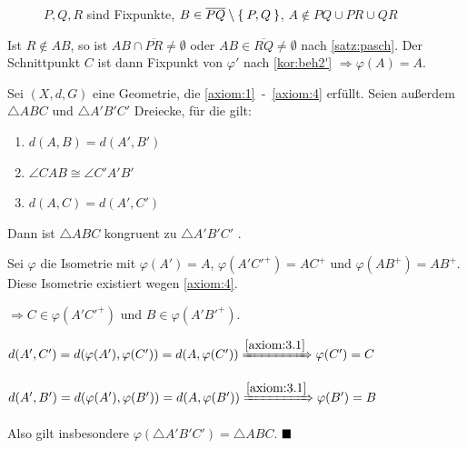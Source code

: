 \begin{beweis}
\begin{enumerate}[label=(Teil \roman*),ref=(Teil \roman*)]
        \begin{figure}[htp]
            \centering
            
            \caption{$P, Q, R$ sind Fixpunkte, $B \in \overline{PQ} \setminus \Set{P,Q}$, $A \notin PQ \cup PR \cup QR$}
            \label{fig:geometry-1}
        \end{figure}

        Ist $R \notin AB$, so ist $AB \cap \overline{PR} \neq \emptyset$
        oder $AB \in \overline{RQ} \neq \emptyset$ nach \cref{satz:pasch}.
        Der Schnittpunkt $C$ ist dann Fixpunkt von $\varphi'$
        nach \cref{kor:beh2'} $\Rightarrow \varphi(A) = A$.
    \end{enumerate}
\end{beweis}

\begin{bemerkung}%
    Sei $(X, d, G)$ eine Geometrie, die \ref{axiom:1}~-~\ref{axiom:4} erfüllt.
    Seien außerdem $\triangle ABC$ und $\triangle A'B'C'$ Dreiecke, für die gilt:
    \begin{enumerate}[label=(\roman*)]
        \item \label{bem:sws.i} $d(A, B) = d(A', B')$
        \item \label{bem:sws.ii} $\angle CAB \cong \angle C'A'B'$
        \item \label{bem:sws.iii} $d(A, C) = d(A', C')$
    \end{enumerate}

    Dann ist $\triangle ABC$ kongruent zu $\triangle A'B'C'$ .
\end{bemerkung}

\begin{beweis}
    Sei $\varphi$ die Isometrie mit $\varphi(A') = A$, $\varphi(A'C'^+) = AC^+$
    und $\varphi(AB^+) = AB^+$. Diese Isometrie existiert wegen \cref{axiom:4}.

    $\Rightarrow C \in \varphi(A'C'^+)$ und $B \in \varphi(A'B'^+)$.

    $d(A',C')= d(\varphi(A'), \varphi(C')) = d(A, \varphi(C')) \xRightarrow{\ref{axiom:3.1}} \varphi(C') = C$

    $d(A',B')= d(\varphi(A'), \varphi(B')) = d(A, \varphi(B')) \xRightarrow{\ref{axiom:3.1}} \varphi(B') = B$

    Also gilt insbesondere $\varphi(\triangle A'B'C') = \triangle ABC$. $\qed$
\end{beweis}
    

